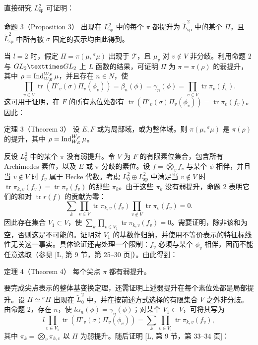 直接研究 $L_{\mathrm{sp}}^2$ 可证明：

\begin{originaltheorem}{命题 3（Proposition 3）}
出现在 $L_{\mathrm{sp}}^2$ 中的每个 $\pi$ 都提升为 $\widetilde L_{\mathrm{sp}}^2$ 中的某个 $\Pi$，且 $\widetilde L_{\mathrm{sp}}^2$ 中所有被 $\sigma$ 固定的表示均由此得到。
\end{originaltheorem}

当 $l=2$ 时，假定 $\Pi=\pi(\mu,{}^\sigma\mu)$ 出现于 $\mathcal T$，且 $\mu_v$ 对 $v\notin V$ 非分歧。利用命题 2 与 $\GL_2\times\GL_2$ 上 $L$ 函数的结果，可证明 $\Pi$ 为 $\pi=\pi(\rho)$ 的弱提升，其中 $\rho=\operatorname{Ind}_{W_E}^{W_F}\mu$，并且存在 $n\in N$，使
\[
 \prod_{v\in V}\operatorname{tr}(\Pi'_v(\sigma)\Pi_v(\phi_v))
 =\beta_n(\phi)=\gamma_n(\phi)
 =\prod_{v\in V}\operatorname{tr}\pi_v(f_v).
\]
这可用于证明，在 $F$ 的所有素位处都有 $\operatorname{tr}(\Pi'_v(\sigma)\Pi_v(\phi_v))=\operatorname{tr}\pi_v(f_v)$。因此：

\begin{originaltheorem}{定理 3（Theorem 3）}
设 $E,F$ 或为局部域，或为整体域。则 $\pi(\mu,{}^\sigma\mu)$ 是 $\pi(\rho)$ 的提升，其中 $\rho=\operatorname{Ind}_{W_E}^{W_F}\mu$。
\end{originaltheorem}

反设 $L_0^2$ 中的某个 $\pi$ 没有弱提升。令 $V$ 为 $F$ 的有限素位集合，包含所有 Archimedes 素位，以及 $E$ 或 $\pi$ 分歧的素位。设 $f=\bigotimes_vf_v$ 与某个 $\phi$ 相伴，并且当 $v\notin V$ 时 $f_v$ 属于 Hecke 代数。考虑 $L_0^2\oplus L_{\mathrm{sp}}^2$ 中满足当 $v\notin V$ 时 $\operatorname{tr}\pi_{k,v}(f_v)=\operatorname{tr}\pi_v(f_v)$ 的那些 $\pi_k$。由于这些 $\pi_k$ 没有弱提升，命题 2 表明它们的和对 $\operatorname{tr}r(f)$ 的贡献为零：
\[
 \sum_k\prod_{v\in V}\operatorname{tr}\pi_{k,v}(f_v)
 \prod_{v\notin V}\operatorname{tr}\pi_v(f_v)=0.
\]
因此存在集合 $V_1\subset V$，使 $\sum_k\prod_{v\in V_1}\operatorname{tr}\pi_{k,v}(f_v)=0$。需要证明，除非该和为空，否则这是不可能的。证明对 $V_1$ 的基数作归纳，并使用不等价表示的特征标线性无关这一事实。具体论证还需处理一个限制：$f_v$ 必须与某个 $\phi_v$ 相伴，因而不能任意选取（参见 [L, 第 9 节，第 25--30 页]）。由此得到：

\begin{originaltheorem}{定理 4（Theorem 4）}
每个尖点 $\pi$ 都有弱提升。
\end{originaltheorem}

要完成尖点表示的整体基变换定理，还需证明上述弱提升在每个素位处都是局部提升。设 $\Pi\simeq{}^\sigma\Pi$ 出现在 $\widetilde L_0^2$ 中，并在按前述方式选择的有限集合 $V$ 之外非分歧。由命题 2，存在 $n$，使 $l\alpha_n(\phi)=\gamma_n(\phi)$；对某个 $V_1\subset V$，可将其写为
\[
 l\prod_{v\in V_1}\operatorname{tr}(\Pi'_v(\sigma)\Pi_v(\phi_v))
 =\sum_k\prod_{v\in V_1}\operatorname{tr}\pi_{k,v}(f_v),
\]
其中 $\pi_k=\bigotimes_v\pi_{k,v}$ 以 $\Pi$ 为弱提升。随后证明 [L, 第 9 节，第 33--34 页]：

